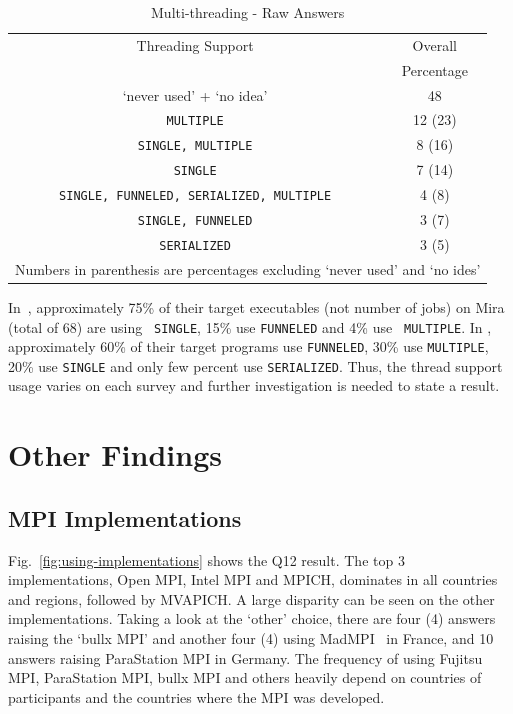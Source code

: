 \documentclass[conference,10pt,letterpaper]{IEEEtran}
\def\myquote#1{`#1'}
\begin{document}
\begin{table}[htb]%
  \begin{center}%
    \caption{Multi-threading - Raw Answers}\label{tab:multi-thread-raw}%
    \begin{tabular}{c|c}%
      \hline%
      Threading Support & Overall \\
       & Percentage \\
      \hline%
      \myquote{never used} + \myquote{no idea} & 48 \\
      {\tt MULTIPLE} & 12 (23) \\
      {\tt SINGLE, MULTIPLE} & 8 (16) \\
      {\tt SINGLE} & 7 (14) \\
      {\tt SINGLE, FUNNELED, SERIALIZED, MULTIPLE} & 4 (8) \\
      {\tt SINGLE, FUNNELED} & 3 (7) \\
      {\tt SERIALIZED} & 3 (5) \\
      \hline%
      \multicolumn{2}{c}{\footnotesize Numbers in parenthesis are
        percentages excluding \myquote{never used} and \myquote{no
          ides}} 
    \end{tabular}%
  \end{center}%
\end{table}%

In~\cite{10.1109/SC.2018.00033}, approximately 75\% of their target
executables (not number of jobs) on Mira (total of 68) are using {\tt
  SINGLE}, 15\% use {\tt FUNNELED} and 4\% use {\tt
  MULTIPLE}. In \cite{10.1145/3295500.3356176},  approximately 60\% of
their target programs use {\tt FUNNELED}, 30\% use {\tt MULTIPLE}, 20\%
use {\tt SINGLE} and only few percent use {\tt SERIALIZED}. Thus, the
thread support usage varies on each survey and further investigation
is needed to state a result.

\section{Other Findings}

\subsection{MPI Implementations}

Fig.~\ref{fig:using-implementations} shows the Q12 result. The top 3
implementations, Open MPI, Intel MPI and MPICH, dominates in all
countries and regions, followed by MVAPICH. A large disparity can be
seen on the other implementations. Taking a
look at the \myquote{other} choice, there are four (4) answers raising the
\myquote{bullx MPI} and another four (4) using MadMPI~\cite{madmpi} in
France, and 10 
answers raising ParaStation MPI in Germany. The frequency of using
Fujitsu MPI, ParaStation MPI, bullx MPI and others heavily depend on
countries of participants and the countries where the MPI was
developed. 
\end{document}
